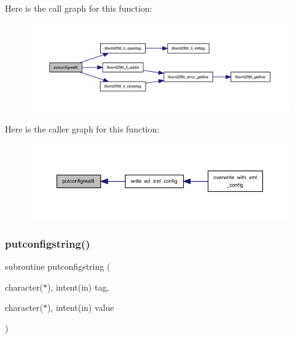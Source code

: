 Here is the call graph for this function\+:
\nopagebreak
\begin{figure}[H]
\begin{center}
\leavevmode
\includegraphics[width=350pt]{ed__xml__config_8f90_ad862c7defff292e3810aa4ee8a730a35_cgraph}
\end{center}
\end{figure}
Here is the caller graph for this function\+:
\nopagebreak
\begin{figure}[H]
\begin{center}
\leavevmode
\includegraphics[width=350pt]{ed__xml__config_8f90_ad862c7defff292e3810aa4ee8a730a35_icgraph}
\end{center}
\end{figure}
\mbox{\label{ed__xml__config_8f90_aac9f776b36e63aa8454d3841e3fda182}} 
\subsubsection{\texorpdfstring{putconfigstring()}{putconfigstring()}}
{\footnotesize\ttfamily subroutine putconfigstring (\begin{DoxyParamCaption}\item[{character($\ast$), intent(in)}]{tag,  }\item[{character($\ast$), intent(in)}]{value }\end{DoxyParamCaption})}

